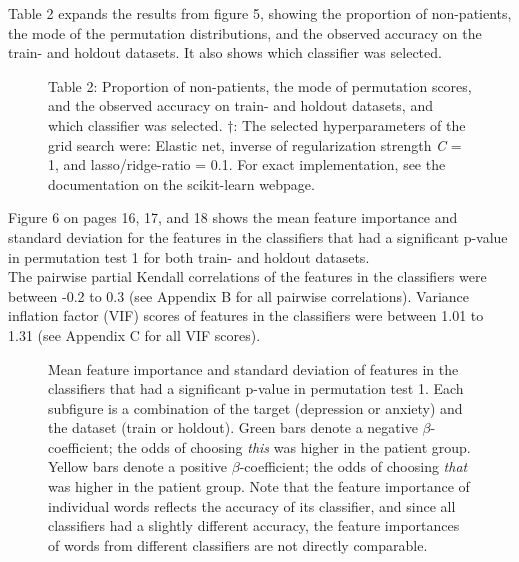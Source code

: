 \documentclass[11pt, a4paper]{article}
\begin{document}
\newpage

Table 2 expands the results from figure 5, showing the proportion of non-patients, the mode of the permutation distributions, and the observed accuracy on the train- and holdout datasets. It also shows which classifier was selected.
\begin{figure}[hbt!]
\centering

\caption*{Table 2: Proportion of non-patients, the mode of permutation scores, and the observed accuracy on train- and holdout datasets, and which classifier was selected. $ \dag  $: The selected hyperparameters of the grid search were: Elastic net, inverse of regularization strength \textit{C} = 1, and lasso/ridge-ratio = 0.1. For exact implementation, see the documentation on the scikit-learn webpage. 
 }
\end{figure}


Figure 6 on pages 16, 17, and 18 shows the mean feature importance and standard deviation for the features in the classifiers that had a significant p-value in permutation test 1 for both train- and holdout datasets. \\

The pairwise partial Kendall correlations of the features in the classifiers were between -0.2 to 0.3 (see Appendix B for all pairwise correlations). Variance inflation factor (VIF) scores of features in the classifiers were between 1.01 to 1.31 (see Appendix C for all VIF scores).


\begin{figure}
\centering
\vspace{-0.7cm}

\end{figure}

\begin{figure}
\centering
\vspace{-0.7cm}

\end{figure}

\begin{figure}
\centering
\vspace{-0.7cm}

\caption{\label{fig:data} Mean feature importance and standard deviation of features in the classifiers that had a significant p-value in permutation test 1. Each subfigure is a combination of the target (depression or anxiety) and the dataset (train or holdout). Green bars denote a negative $\beta$-coefficient; the odds of choosing \textit{this} was higher in the patient group. Yellow bars denote a positive $\beta$-coefficient; the odds of choosing \textit{that} was higher in the patient group. Note that the feature importance of individual words reflects the accuracy of its classifier, and since all classifiers had a slightly different accuracy, the feature importances of words from different classifiers are not directly comparable. 
}
\end{figure}
\end{document}
